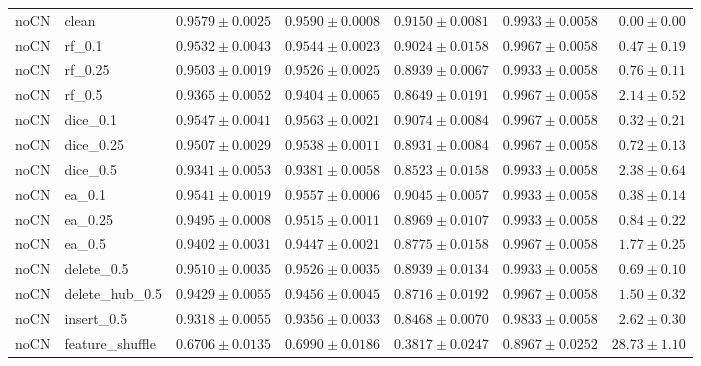 \documentclass[UTF8,a4paper,11pt,fontset=fandol]{ctexart}
\begin{document}
{\begin{longtable}{llrrrrr}
noCN & clean & $0.9579\pm0.0025$ & $0.9590\pm0.0008$ & $0.9150\pm0.0081$ & $0.9933\pm0.0058$ & $0.00\pm0.00$ \\
noCN & rf\_0.1 & $0.9532\pm0.0043$ & $0.9544\pm0.0023$ & $0.9024\pm0.0158$ & $0.9967\pm0.0058$ & $0.47\pm0.19$ \\
noCN & rf\_0.25 & $0.9503\pm0.0019$ & $0.9526\pm0.0025$ & $0.8939\pm0.0067$ & $0.9933\pm0.0058$ & $0.76\pm0.11$ \\
noCN & rf\_0.5 & $0.9365\pm0.0052$ & $0.9404\pm0.0065$ & $0.8649\pm0.0191$ & $0.9967\pm0.0058$ & $2.14\pm0.52$ \\
noCN & dice\_0.1 & $0.9547\pm0.0041$ & $0.9563\pm0.0021$ & $0.9074\pm0.0084$ & $0.9967\pm0.0058$ & $0.32\pm0.21$ \\
noCN & dice\_0.25 & $0.9507\pm0.0029$ & $0.9538\pm0.0011$ & $0.8931\pm0.0084$ & $0.9967\pm0.0058$ & $0.72\pm0.13$ \\
noCN & dice\_0.5 & $0.9341\pm0.0053$ & $0.9381\pm0.0058$ & $0.8523\pm0.0158$ & $0.9933\pm0.0058$ & $2.38\pm0.64$ \\
noCN & ea\_0.1 & $0.9541\pm0.0019$ & $0.9557\pm0.0006$ & $0.9045\pm0.0057$ & $0.9933\pm0.0058$ & $0.38\pm0.14$ \\
noCN & ea\_0.25 & $0.9495\pm0.0008$ & $0.9515\pm0.0011$ & $0.8969\pm0.0107$ & $0.9933\pm0.0058$ & $0.84\pm0.22$ \\
noCN & ea\_0.5 & $0.9402\pm0.0031$ & $0.9447\pm0.0021$ & $0.8775\pm0.0158$ & $0.9967\pm0.0058$ & $1.77\pm0.25$ \\
noCN & delete\_0.5 & $0.9510\pm0.0035$ & $0.9526\pm0.0035$ & $0.8939\pm0.0134$ & $0.9933\pm0.0058$ & $0.69\pm0.10$ \\
noCN & delete\_hub\_0.5 & $0.9429\pm0.0055$ & $0.9456\pm0.0045$ & $0.8716\pm0.0192$ & $0.9967\pm0.0058$ & $1.50\pm0.32$ \\
noCN & insert\_0.5 & $0.9318\pm0.0055$ & $0.9356\pm0.0033$ & $0.8468\pm0.0070$ & $0.9833\pm0.0058$ & $2.62\pm0.30$ \\
noCN & feature\_shuffle & $0.6706\pm0.0135$ & $0.6990\pm0.0186$ & $0.3817\pm0.0247$ & $0.8967\pm0.0252$ & $28.73\pm1.10$ \\
\end{longtable}
}
\end{document}
